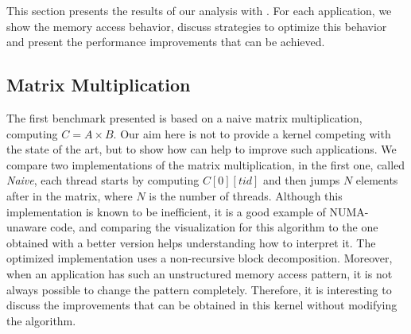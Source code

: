 This section presents the results of our analysis with \TABARNAC.
For each application, we show the memory access behavior, discuss strategies to optimize this behavior and present the performance improvements that can be achieved.


\subsection{Matrix Multiplication}
\label{sec:exp-mat}

The first benchmark presented is based on a naive matrix multiplication,
computing $C=A \times B$. Our aim here is not to provide a kernel competing with the
state of the art, but to show how \TABARNAC can help to improve such
applications. We compare two implementations of the matrix multiplication, in
the first one, called \emph{Naive}, each thread starts by computing
$C[0][tid]$ and then jumps $N$ elements after in the matrix, where $N$ is the
number of threads. Although this implementation is known to be inefficient, it is a
good example of NUMA-unaware code, and comparing the \TABARNAC visualization
for this algorithm to the one obtained with a better version helps understanding
how to interpret it.
The optimized implementation uses a non-recursive block
decomposition.
Moreover, when an application has such an unstructured memory access pattern, it
is not always possible to change the pattern completely. Therefore, it is
interesting to discuss the improvements that can be obtained in this kernel without
modifying the algorithm.



